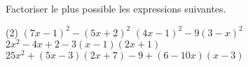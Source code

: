 \documentclass[a4paper,12pt]{report}
\begin{document}
\begin{boiteExT}
	\vspace{6cm}	

\end{boiteExT}

\begin{exo}
Factoriser le plus possible les expressions suivantes.
  \begin{tasks}(2)
  	\task $(7x-1)^2-(5x+2)^2$
	\task $(4x-1)^2-9(3-x)^2$
	\task $2x^2-4x+2-3(x-1)(2x+1)$
	\task $25x^2+(5x-3)(2x+7)-9+(6-10x)(x-3)$
  \end{tasks}
\end{exo}
\end{document}
